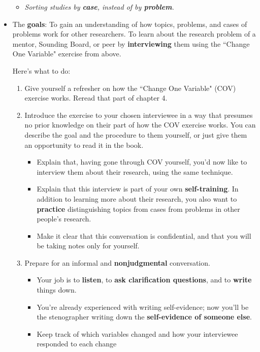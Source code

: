 \documentclass[11pt]{article}
\begin{document}
\begin{itemize}
\begin{itemize}
\item \emph{Sorting studies by \textbf{case}, instead of by \textbf{problem}.}
\end{itemize}


\vspace{20pt}
\item  \begin{exercise}

The \textbf{goals}: To gain an understanding of how topics, problems, and cases of problems work for other researchers. To learn about the research problem of a mentor, Sounding Board, or peer by \textbf{interviewing} them using the ``Change One Variable" exercise from above.

Here’s what to do:
\begin{enumerate}
\item Give yourself a refresher on how the ``Change One Variable" (COV) exercise works. Reread that part of
chapter 4.

\item Introduce the exercise to your chosen interviewee in a way that presumes no prior knowledge on their part of how the COV exercise works. You can describe the goal and the procedure to them yourself, or just give them an opportunity to read it in the book. 
\begin{itemize}
\item Explain that, having gone through COV yourself, you’d now like to interview them about their research, using the same technique.

\item Explain that this interview is part of your own \textbf{self-training}. In addition to learning more about their research, you also want to \textbf{practice} distinguishing topics from cases from problems in other people's research. 

\item  Make it clear that this conversation is confidential, and that you will be taking notes only for yourself.
\end{itemize}

\item Prepare for an informal and \textbf{nonjudgmental} conversation. 
\begin{itemize}
\item Your job is to \textbf{listen}, to \textbf{ask clarification questions}, and to \textbf{write} things down.
\item You’re already experienced with writing self-evidence; now you’ll be the stenographer writing down the \textbf{self-evidence of someone else}. 
\item Keep track of which variables changed and how your interviewee responded to each change
\end{itemize}


\end{enumerate}
\end{exercise}
\end{itemize}
\end{document}
